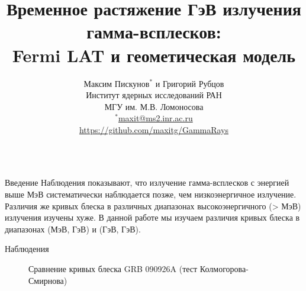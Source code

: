 \documentclass[russian]{beamer}
\title{Временное растяжение ГэВ излучения гамма-всплесков:\\[0.2ex]Fermi LAT и геометическая модель}
\author{
	{\Large Максим Пискунов$^{*}$ и Григорий Рубцов} \\[0.5ex]
	{\large Институт ядерных исследований РАН} \\[0.4ex]
	{\large МГУ им. М.В. Ломоносова} \\[0.6ex]
	{\normalsize $^{*}$\href{mailto:maxit@ms2.inr.ac.ru}{maxit@ms2.inr.ac.ru}} \\
	\hfill {\normalsize \url{https://github.com/maxitg/GammaRays}}
}
\begin{document}
	
	\begin{frame}
		\begin{columns}[t]

			\begin{column}[t]{0.4\linewidth}

			   	\begin{block}{Введение}
					Наблюдения показывают, что излучение гамма-всплесков с энергией выше \unit[100]{МэВ} систематически наблюдается позже, чем низкоэнергичное излучение. Различия же кривых блеска в различных диапазонах высокоэнергичного (> \unit[100]{МэВ}) излучения изучены хуже. В данной работе мы изучаем различия кривых блеска в диапазонах (\unit[100]{МэВ}, \unit[1]{ГэВ}) и (\unit[1]{ГэВ}, \unit[300]{ГэВ}).
			   	\end{block}

			   	\begin{block}{Наблюдения}

					\begin{figure}

						\centering
						{\large Сравнение кривых блеска GRB 090926A (тест Колмогорова-Смирнова)}
						 \\
						 \\
						\label{Figures}


\end{figure}
\end{block}
\end{column}
\end{columns}
\end{frame}
\end{document}
